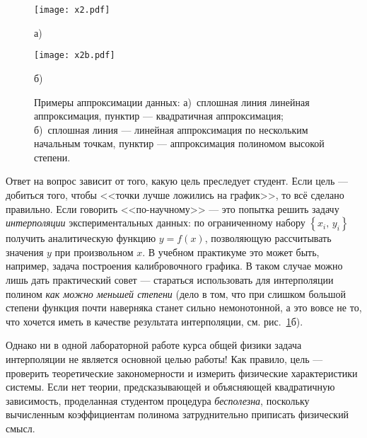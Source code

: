 \documentclass[10pt]{article}
\begin{document}
\begin{figure}[h]
\begin{minipage}[t]{0.49\columnwidth}%
\begin{center}
\texttt{[image: x2.pdf]}
\par\end{center}
\begin{center}
а)
\par\end{center}%
\end{minipage}%
\begin{minipage}[t]{0.49\columnwidth}%
\begin{center}
\texttt{[image: x2b.pdf]}
\par\end{center}
\begin{center}
б)
\par\end{center}%
\end{minipage}

\caption{\label{fig:approx}Примеры аппроксимации данных: а)~сплошная линия
\textendash{} линейная аппроксимация, пунктир --- квадратичная
аппроксимация; б)~сплошная линия --- линейная аппроксимация
по нескольким начальным точкам, пунктир --- аппроксимация
полиномом высокой степени.}
\end{figure}

{\footnotesize{}Ответ на вопрос зависит от того, какую цель преследует
студент. Если цель --- добиться того, чтобы <<точки
лучше ложились на график>>, то всё сделано правильно.
Если говорить <<по-научному>> ---
это попытка решить задачу }\emph{\footnotesize{}интерполяции}{\footnotesize{}
экспериментальных данных: по ограниченному набору $\left\{ x_{i},\,y_{i}\right\} $
получить аналитическую функцию $y=f\!\left(x\right)$, позволяющую
рассчитывать значения $y$ при произвольном $x$. В учебном практикуме
это может быть, например, задача построения калибровочного графика.
В таком случае можно лишь дать практический совет --- стараться
использовать для интерполяции полином }\emph{\footnotesize{}как можно
меньшей степени}{\footnotesize{} (дело в том, что при слишком большой
степени функция почти наверняка станет сильно немонотонной, а это
вовсе не то, что хочется иметь в качестве результата интерполяции,
см. рис.~\ref{fig:approx}б).}{\footnotesize\par}

{\footnotesize{}Однако ни в одной лабораторной работе курса общей
физики задача интерполяции не является основной целью работы! Как
правило, цель --- проверить теоретические закономерности
и измерить физические характеристики системы. Если нет теории, предсказывающей
и объясняющей квадратичную зависимость, проделанная студентом процедура
}\emph{\footnotesize{}бесполезна}{\footnotesize{}, поскольку вычисленным
коэффициентам полинома затруднительно приписать физический смысл. }{\footnotesize\par}
\end{document}

